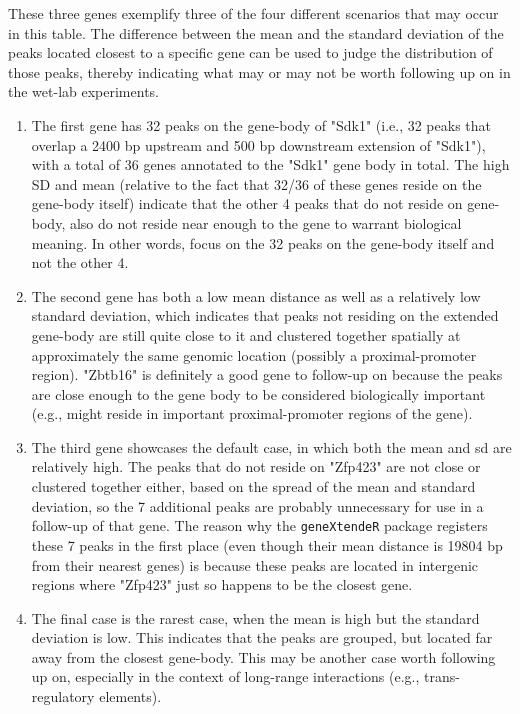 \documentclass[12pt]{article}
\begin{document}
These three genes exemplify three of the four different scenarios that may occur in this table. The difference between the mean and the standard deviation of the peaks located closest to a specific gene can be used to judge the distribution of those peaks, thereby indicating what may or may not be worth following up on in the wet-lab experiments.
\begin{enumerate}
\item The first gene has 32 peaks on the gene-body of "Sdk1" (i.e., 32 peaks that overlap a 2400 bp upstream and 500 bp downstream extension of "Sdk1"), with a total of 36 genes annotated to the "Sdk1" gene body in total. The high SD and mean (relative to the fact that 32/36 of these genes reside on the gene-body itself) indicate that the other 4 peaks that do not reside on gene-body, also do not reside near enough to the gene to warrant biological meaning. In other words, focus on the 32 peaks on the gene-body itself and not the other 4.
\item The second gene has both a low mean distance as well as a relatively low standard deviation, which indicates that peaks not residing on the extended gene-body are still quite close to it and clustered together spatially at approximately the same genomic location (possibly a proximal-promoter region).  "Zbtb16" is definitely a good gene to follow-up on because the peaks are close enough to the gene body to be considered biologically important (e.g., might reside in important proximal-promoter regions of the gene).
\item The third gene showcases the default case, in which both the mean and sd are relatively high. The peaks that do not reside on "Zfp423" are not close or clustered together either, based on the spread of the mean and standard deviation, so the 7 additional peaks are probably unnecessary for use in a follow-up of that gene.  The reason why the \texttt{geneXtendeR} package registers these 7 peaks in the first place (even though their mean distance is 19804 bp from their nearest genes) is because these peaks are located in intergenic regions where "Zfp423" just so happens to be the closest gene.
\item The final case is the rarest case, when the mean is high but the standard deviation is low. This indicates that the peaks are grouped, but located far away from the closest gene-body. This may be another case worth following up on, especially in the context of long-range interactions (e.g., trans-regulatory elements).
\end{enumerate}
\end{document}

